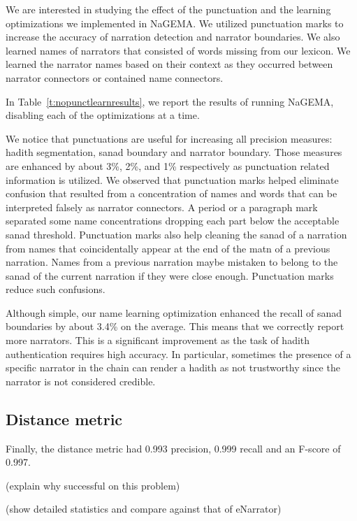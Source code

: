 \documentclass[11pt]{article}
\begin{document}
We are interested in studying the effect of the punctuation 
and the learning optimizations we implemented in NaGEMA.
We utilized punctuation marks to increase the accuracy of narration detection and narrator boundaries. 
We also learned names of narrators that consisted of words missing from 
our lexicon.
We learned the narrator names based on their context as they occurred 
between narrator connectors or contained name connectors. 

In Table~\ref{t:nopunctlearnresults}, we report the results of running NaGEMA, 
disabling each of the optimizations at a time.

We notice that punctuations are useful for increasing all precision measures: hadith segmentation, sanad boundary and
narrator boundary. Those measures are enhanced by about 
3\%, 2\%, and 1\% respectively as punctuation related 
information is utilized.  
We observed that punctuation marks helped eliminate confusion that resulted from a 
concentration of names and words that 
can be interpreted falsely as narrator connectors. 
A period or a paragraph mark separated some name concentrations 
dropping each part below the acceptable sanad threshold. 
Punctuation marks also help cleaning the sanad of a narration from 
names that coincidentally appear at the 
end of the matn of a previous narration. 
Names from a previous narration maybe mistaken to belong to the sanad of the current 
narration if they were close enough. 
Punctuation marks reduce such confusions.


Although simple, our name learning optimization enhanced the recall 
of sanad boundaries by about 3.4\% on the average.
This means that we correctly report more narrators.
This is a significant improvement as the task of hadith authentication requires high accuracy. 
In particular, sometimes the presence of a specific narrator in the chain can render a 
hadith as not trustworthy since the narrator is not considered credible.

\subsection{Distance metric}
Finally, the distance metric had 0.993 precision,
0.999 recall and an F-score of 0.997.

(explain why successful on this problem)

(show detailed statistics and compare against that of eNarrator)
\end{document}
